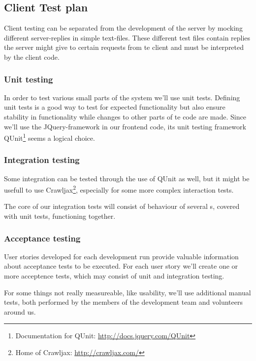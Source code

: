 \subsection{Client Test plan}
Client testing can be separated from the development of the server by mocking different server-replies in simple text-files. These different test files contain replies the server might give to certain requests from te client and must be interpreted by the client code. 

\subsubsection{Unit testing}
In order to test various small parts of the system we'll use unit tests. Defining unit tests is a good way to test for expected functionality but also ensure stability in functionality while changes to other parts of te code are made. Since we'll use the JQuery-framework in our frontend code, its unit testing framework QUnit\footnote{Documentation for QUnit: \url{http://docs.jquery.com/QUnit}} seems a logical choice. 

\subsubsection{Integration testing}
Some integration can be tested through the use of QUnit as well, but it might be usefull to use Crawljax\footnote{Home of Crawljax: \url{http://crawljax.com/}}, especially for some more complex interaction tests.

The core of our integration tests will consist of behaviour of several s, covered with unit tests, functioning together.

\subsubsection{Acceptance testing}
User stories developed for each development run provide valuable information about acceptance tests to be executed. For each user story we'll create one or more acceptence tests, which may consist of unit and integration testing.

For some things not really measureable, like usability, we'll use additional manual tests, both performed by the members of the development team and volunteers around us.
